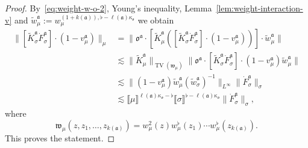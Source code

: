 \documentclass{article}
\numberwithin{equation}{section}
\newcommand{\assign}{:=}
\theoremstyle{plain}
\theoremstyle{definition}
\begin{document}
\begin{proof}
  By~\eqref{eq:weight-w-o-2}, Young's inequality,
  Lemma~\ref{lem:weight-interaction-v} and $\tilde{w}^{\mathfrak{a}}_{\mu}
  \assign w^{(1 + k (\mathfrak{a})), \flat - \ell (\mathfrak{a})
  \kappa_{\mathfrak{o}}}_{\mu}$ we obtain
  \[ \begin{aligned}
       \| [\tilde{K}^{\mathfrak{a}}_{\sigma} \dot{F}^{\mathfrak{a}}_{\sigma}]
       \cdot (1 - v^{\mathfrak{a}}_{\mu}) \|_{\mu} & =  \|
       \mathfrak{o}^{\mathfrak{a}} \cdot [\tilde{K}^{\mathfrak{a}}_{\mu}
       ([\tilde{K}^{\mathfrak{a}}_{\sigma} \dot{F}^{\mathfrak{a}}_{\sigma}]
       \cdot (1 - v^{\mathfrak{a}}_{\mu}))] \cdot
       \tilde{w}_{\mu}^{\mathfrak{a}} \|\\
       & \lesssim  \| \tilde{K}^{\mathfrak{a}}_{\mu} \|_{\operatorname{TV}
       (\mathfrak{w}_{\mu})}  \| \mathfrak{o}^{\mathfrak{a}} \cdot
       [\tilde{K}^{\mathfrak{a}}_{\sigma} \dot{F}^{\mathfrak{a}}_{\sigma}]
       \cdot (1 - v^{\mathfrak{a}}_{\mu}) \tilde{w}_{\mu}^{\mathfrak{a}} \|\\
       & \lesssim  \| (1 - v^{\mathfrak{a}}_{\mu})
       \tilde{w}_{\mu}^{\mathfrak{a}}  (\tilde{w}_{\sigma}^{\mathfrak{a}})^{-
       1} \|_{L^{\infty}}  \| \dot{F}^{\mathfrak{a}}_{\sigma} \|_{\sigma}\\
       & \lesssim  \llbracket \mu \rrbracket^{\ell (\mathfrak{a})
       \kappa_{\mathfrak{o}} - \flat} \llbracket \sigma \rrbracket^{\flat -
       \ell (\mathfrak{a}) \kappa_{\mathfrak{o}}} \|
       \dot{F}^{\mathfrak{a}}_{\sigma} \|_{\sigma},
     \end{aligned} \]
  where
  \[ \mathfrak{w}_{\mu} (z, z_1, \ldots, z_{k
     (\mathfrak{a})}) {= w_{\mu}^2}  (z) {w_{\mu}^{\flat}}  (z_1) {\cdots
     w_{\mu}^{\flat}}  (z_{k (\mathfrak{a})}) . \]
  This proves the statement.
\end{proof}
\end{document}
